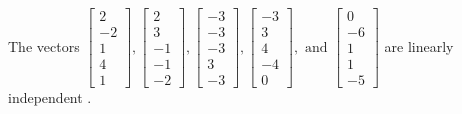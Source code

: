 \begin{exercise}
\begin{exerciseStatement}
  \end{exerciseStatement}
  \begin{exerciseAnswer}
   The vectors \(\left[\begin{array}{r}
2 \\
-2 \\
1 \\
4 \\
1
\end{array}\right] , \left[\begin{array}{r}
2 \\
3 \\
-1 \\
-1 \\
-2
\end{array}\right] , \left[\begin{array}{r}
-3 \\
-3 \\
-3 \\
3 \\
-3
\end{array}\right] , \left[\begin{array}{r}
-3 \\
3 \\
4 \\
-4 \\
0
\end{array}\right] , \text{ and } \left[\begin{array}{r}
0 \\
-6 \\
1 \\
1 \\
-5
\end{array}\right]\) are 
  	 linearly independent  .
  


  \end{exerciseAnswer}
\end{exercise}